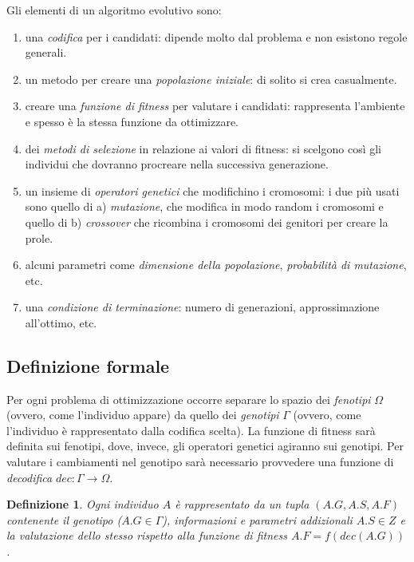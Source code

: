 \documentclass[10pt,a4paper]{article}
\newtheorem{definition}{Definizione}
\begin{document}
Gli elementi di un algoritmo evolutivo sono:

\begin{enumerate}
\item{una \emph{codifica} per i candidati: dipende molto dal problema e non esistono regole generali.}
\item{un metodo per creare una \emph{popolazione iniziale}: di solito si crea casualmente.}
\item{creare una \emph{funzione di fitness} per valutare i candidati: rappresenta l'ambiente e spesso è la stessa funzione da ottimizzare.}
\item{dei \emph{metodi di selezione} in relazione ai valori di fitness: si scelgono così gli individui che dovranno procreare nella successiva generazione.}
\item{un insieme di \emph{operatori genetici} che modifichino i cromosomi: i due più usati sono quello di a) \emph{mutazione}, che modifica in modo random i cromosomi e quello di b) \emph{crossover} che ricombina i cromosomi dei genitori per creare la prole.}
\item{alcuni parametri come \emph{dimensione della popolazione}, \emph{probabilità di mutazione}, etc.}
\item{una \emph{condizione di terminazione}: numero di generazioni, approssimazione all'ottimo, etc.}
\end{enumerate}

\subsection{Definizione formale}

Per ogni problema di ottimizzazione occorre separare lo spazio dei \emph{fenotipi} $\Omega$ (ovvero, come l'individuo appare) da quello dei \emph{genotipi} $\Gamma$ (ovvero, come l'individuo è rappresentato dalla codifica scelta). La funzione di fitness sarà definita sui fenotipi, dove, invece, gli operatori genetici agiranno sui genotipi. Per valutare i cambiamenti nel genotipo sarà necessario provvedere una funzione di \emph{decodifica} $dec: \Gamma \to \Omega$.

\begin{definition}
Ogni \emph{individuo} $A$ è rappresentato da un tupla $(A.G, A.S, A.F)$ contenente il genotipo ($A.G \in \Gamma$), informazioni e parametri addizionali $A.S \in Z$ e la valutazione dello stesso rispetto alla funzione di fitness $A.F = f(dec(A.G))$.
\end{definition}
\end{document}

